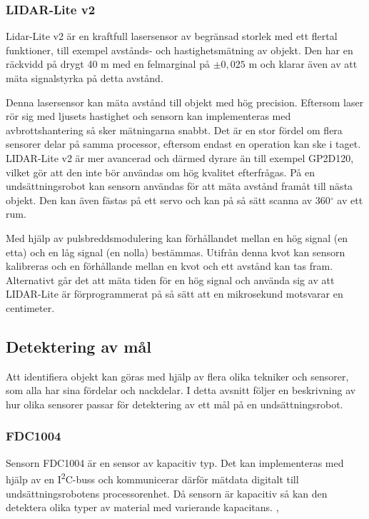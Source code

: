 \documentclass[11pt]{article}
\begin{document}
\begin{flushleft}
\subsubsection{LIDAR-Lite v2}
Lidar-Lite v2 är en kraftfull lasersensor av begränsad storlek med ett flertal funktioner, till exempel avstånds- och hastighetsmätning av objekt. Den har en räckvidd på drygt 40 m med en felmarginal på $\pm 0,025$ m och klarar även av att mäta signalstyrka på detta avstånd. \cite{Lidar}

Denna lasersensor kan mäta avstånd till objekt med hög precision. Eftersom laser rör sig med ljusets hastighet och sensorn kan implementeras med avbrottshantering så sker mätningarna snabbt. Det är en stor fördel om flera sensorer delar på samma processor, eftersom endast en operation kan ske i taget. LIDAR-Lite v2 är mer avancerad och därmed dyrare än till exempel GP2D120, vilket gör att den inte bör användas om hög kvalitet efterfrågas. På en undsättningsrobot kan sensorn användas för att mäta avstånd framåt till nästa objekt. Den kan även fästas på ett servo och kan på så sätt scanna av 360$^{\circ}$ av ett rum. \cite{Lidar}

Med hjälp av pulsbreddsmodulering kan förhållandet mellan en hög signal (en etta) och en låg signal (en nolla) bestämmas. Utifrån denna kvot kan sensorn kalibreras och en förhållande mellan en kvot och ett avstånd kan tas fram. Alternativt går det att mäta tiden för en hög signal och använda sig av att LIDAR-Lite är förprogrammerat på så sätt att en mikrosekund motsvarar en centimeter. \cite{Lidar}


\subsection{Detektering av mål}
Att identifiera objekt kan göras med hjälp av flera olika tekniker och sensorer, som alla har sina fördelar och nackdelar. I detta avsnitt följer en beskrivning av hur olika sensorer passar för detektering av ett mål på en undsättningsrobot.


\subsubsection{FDC1004} %
Sensorn FDC1004 är en sensor av kapacitiv typ. Det kan implementeras med hjälp av en I\textsuperscript{2}C-buss och kommunicerar därför mätdata digitalt till undsättningsrobotens processorenhet. Då sensorn är kapacitiv så kan den detektera olika typer av material med varierande kapacitans. \cite{Texas}, \cite{Texas2}


\end{flushleft}
\end{document}
